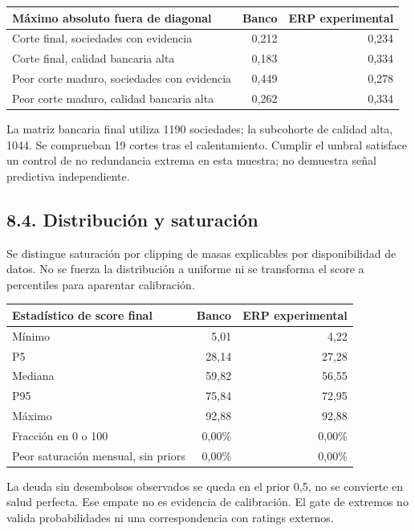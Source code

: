 \begin{center}
\small
\begin{tabular}{p{10cm}rr}
\hline
Máximo absoluto fuera de diagonal & Banco & ERP experimental \\
\hline
Corte final, sociedades con evidencia & 0,212 & 0,234 \\
Corte final, calidad bancaria alta & 0,183 & 0,334 \\
Peor corte maduro, sociedades con evidencia & 0,449 & 0,278 \\
Peor corte maduro, calidad bancaria alta & 0,262 & 0,334 \\
\hline
\end{tabular}
\end{center}

La matriz bancaria final utiliza 1190 sociedades; la subcohorte de calidad alta, 1044. Se comprueban 19 cortes tras el calentamiento. Cumplir el umbral satisface un control de no redundancia extrema en esta muestra; no demuestra señal predictiva independiente.

\subsection*{8.4. Distribución y saturación}
Se distingue saturación por clipping de masas explicables por disponibilidad de datos. No se fuerza la distribución a uniforme ni se transforma el score a percentiles para aparentar calibración.

\begin{center}
\small
\begin{tabular}{lrr}
\hline
Estadístico de score final & Banco & ERP experimental \\
\hline
Mínimo & 5,01 & 4,22 \\
P5 & 28,14 & 27,28 \\
Mediana & 59,82 & 56,55 \\
P95 & 75,84 & 72,95 \\
Máximo & 92,88 & 92,88 \\
Fracción en 0 o 100 & 0,00\% & 0,00\% \\
Peor saturación mensual, sin priors & 0,00\% & 0,00\% \\
\hline
\end{tabular}
\end{center}

La deuda sin desembolsos observados se queda en el prior 0,5, no se convierte en salud perfecta. Ese empate no es evidencia de calibración. El gate de extremos no valida probabilidades ni una correspondencia con ratings externos.

